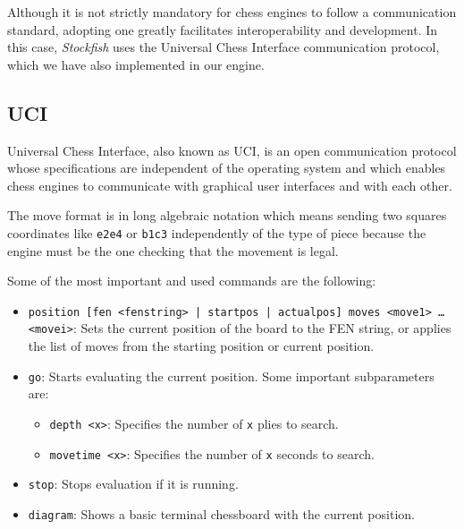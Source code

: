 \vspace{1em}

\noindent Although it is not strictly mandatory for chess engines to follow a communication standard, adopting one greatly facilitates interoperability and development. In this case, \textit{Stockfish} uses the Universal Chess Interface communication protocol, which we have also implemented in our engine.

\subsection*{UCI}

Universal Chess Interface, also known as UCI, is an open communication protocol whose specifications are independent of the operating system and which enables chess engines to communicate with graphical user interfaces and with each other.

\vspace{1em}

\noindent The move format is in long algebraic notation which means sending two squares coordinates like \texttt{e2e4} or \texttt{b1c3} independently of the type of piece because the engine must be the one checking that the movement is legal.

\vspace{1em}

\noindent Some of the most important and used commands are the following:

\begin{itemize}[itemsep=1pt]
    \item \texttt{position [fen <fenstring> | startpos | actualpos] moves <move1> \ldots \\<movei>}: Sets the current position of the board to the FEN string, or applies the list of moves from the starting position or current position.

    \item \texttt{go}: Starts evaluating the current position. Some important subparameters are:
    \begin{itemize}[itemsep=1pt]
        \item \texttt{depth <x>}: Specifies the number of \texttt{x} plies to search.
        \item \texttt{movetime <x>}: Specifies the number of \texttt{x} seconds to search. 
    \end{itemize}

    \item \texttt{stop}: Stops evaluation if it is running.
    \item \texttt{diagram}: Shows a basic terminal chessboard with the current position.
\end{itemize}

